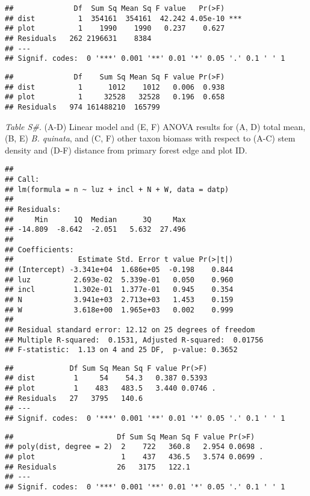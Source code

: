 \documentclass[]{article}
\begin{document}
\begin{verbatim}
##              Df  Sum Sq Mean Sq F value   Pr(>F)    
## dist          1  354161  354161  42.242 4.05e-10 ***
## plot          1    1990    1990   0.237    0.627    
## Residuals   262 2196631    8384                     
## ---
## Signif. codes:  0 '***' 0.001 '**' 0.01 '*' 0.05 '.' 0.1 ' ' 1
\end{verbatim}

\begin{verbatim}
##              Df    Sum Sq Mean Sq F value Pr(>F)
## dist          1      1012    1012   0.006  0.938
## plot          1     32528   32528   0.196  0.658
## Residuals   974 161488210  165799
\end{verbatim}

\emph{Table S\#}. (A-D) Linear model and (E, F) ANOVA results for (A, D)
total mean, (B, E) \emph{B. quinata}, and (C, F) other taxon biomass
with respect to (A-C) stem density and (D-F) distance from primary
forest edge and plot ID.

\begin{verbatim}
## 
## Call:
## lm(formula = n ~ luz + incl + N + W, data = datp)
## 
## Residuals:
##     Min      1Q  Median      3Q     Max 
## -14.809  -8.642  -2.051   5.632  27.496 
## 
## Coefficients:
##               Estimate Std. Error t value Pr(>|t|)
## (Intercept) -3.341e+04  1.686e+05  -0.198    0.844
## luz          2.693e-02  5.339e-01   0.050    0.960
## incl         1.302e-01  1.377e-01   0.945    0.354
## N            3.941e+03  2.713e+03   1.453    0.159
## W            3.618e+00  1.965e+03   0.002    0.999
## 
## Residual standard error: 12.12 on 25 degrees of freedom
## Multiple R-squared:  0.1531, Adjusted R-squared:  0.01756 
## F-statistic:  1.13 on 4 and 25 DF,  p-value: 0.3652
\end{verbatim}

\begin{verbatim}
##             Df Sum Sq Mean Sq F value Pr(>F)  
## dist         1     54    54.3   0.387 0.5393  
## plot         1    483   483.5   3.440 0.0746 .
## Residuals   27   3795   140.6                 
## ---
## Signif. codes:  0 '***' 0.001 '**' 0.01 '*' 0.05 '.' 0.1 ' ' 1
\end{verbatim}

\begin{verbatim}
##                        Df Sum Sq Mean Sq F value Pr(>F)  
## poly(dist, degree = 2)  2    722   360.8   2.954 0.0698 .
## plot                    1    437   436.5   3.574 0.0699 .
## Residuals              26   3175   122.1                 
## ---
## Signif. codes:  0 '***' 0.001 '**' 0.01 '*' 0.05 '.' 0.1 ' ' 1
\end{verbatim}
\end{document}
